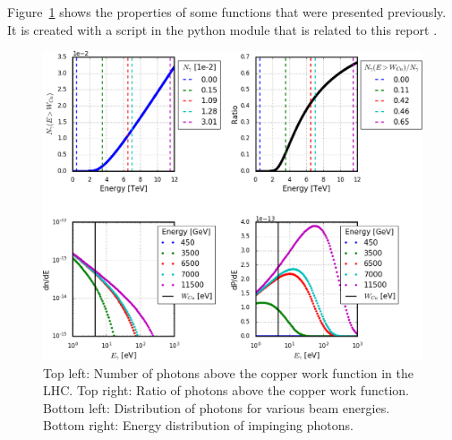 Figure~\ref{fig:n_photons} shows the properties of some functions that were presented previously.
It is created with a script in the python module that is related to this report \cite{cellinput}.
\begin{figure}[tbh]
    \centering
    \includegraphics[width=\textwidth]{./plots/n_photons.png}
    \caption{
        Top left: Number of photons above the copper work function in the LHC.
        Top right: Ratio of photons above the copper work function.
        Bottom left: Distribution of photons for various beam energies.
        Bottom right: Energy distribution of impinging photons.
    }
    \label{fig:n_photons}
\end{figure}

